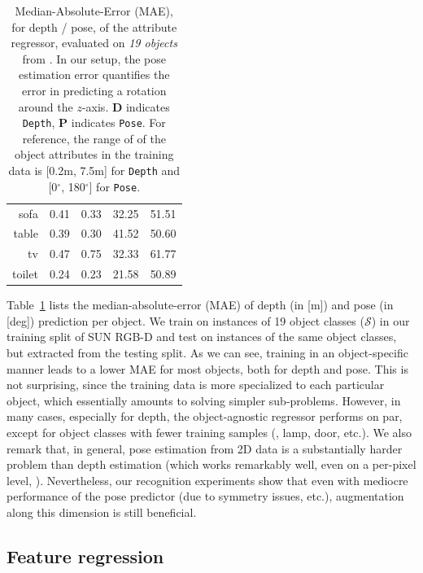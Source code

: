 \documentclass[10pt,twocolumn,letterpaper]{article}
\newcommand{\mnl}[1]{{\color{magenta}{($\leftarrow$ #1)}}}
\begin{document}
\begin{table}[t!]
{\begin{tabular}{rcccc}
                sofa & 0.41 & 0.33& 32.25 & 51.51  \\ 
               table & 0.39 & 0.30 & 41.52 & 50.60\\ 
                  tv & 0.47 & 0.75& 32.33 & 61.77  \\ 
              toilet & 0.24 & 0.23 & 21.58 & 50.89\\ 
		\hline
              \end{tabular}}
\caption{\label{table:maeCOR} Median-Absolute-Error (MAE), for depth / pose, 
of the attribute regressor, evaluated on \emph{19 objects} from \cite{Song15a}.
In our setup, the pose estimation error quantifies the error in predicting a
rotation around the $z$-axis. \textbf{D} indicates \texttt{Depth}, \textbf{P} indicates
\texttt{Pose}. For reference, the range of of the object attributes in the training data
is [0.2m, 7.5m] for \texttt{Depth} and [0$^\circ$, 180$^\circ$] for \texttt{Pose}.}
\end{table}

Table~\ref{table:maeCOR} lists the median-absolute-error (MAE) of
depth (in [m]) and pose (in [deg]) prediction per object. We train
on instances of 19 object classes ($\mathcal{S}$) in our training 
split of SUN RGB-D and test on instances of the same object classes,
but extracted from the testing split.
As we can see, training in an object-specific manner leads to 
a lower MAE for most objects, both for depth and pose. 
This is not surprising, since the training data is more specialized 
to each particular object, which essentially amounts to solving 
simpler sub-problems. However, in many cases, 
especially for depth, the object-agnostic regressor performs on par, 
except for object classes with fewer training samples (\ie, lamp, door, etc.). 
We also remark that, in general, pose estimation from 2D data is
a substantially harder problem than depth estimation (which works
remarkably well, even on a per-pixel level, \cf \cite{Liu15a}). 
Nevertheless, our recognition experiments show that 
even with mediocre performance of the pose predictor (due to 
symmetry issues, etc.), augmentation along this dimension is still 
beneficial.

\subsection{Feature regression}
\label{subsection:EvalFeatureRegression}
\end{document}
